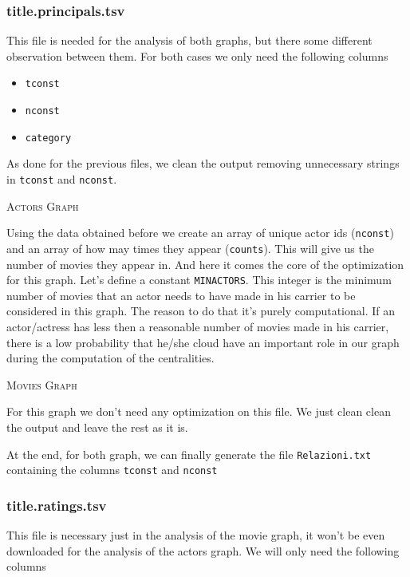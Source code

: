 \subsubsection{title.principals.tsv}

This file is needed for the analysis of both graphs, but there some different observation between them. For both cases we only need the following columns

\begin{itemize}
    \item \texttt{tconst}
    \item \texttt{nconst}
    \item \texttt{category}
\end{itemize}

\noindent As done for the previous files, we clean the output removing unnecessary strings in \texttt{tconst} and \texttt{nconst}. \s

\textsc{Actors Graph}
\s

\noindent Using the data obtained  before we create an array of unique actor ids (\texttt{nconst}) and an array of how may times they appear (\texttt{counts}). This will give us the number of movies they appear in. And here it comes the core of the optimization for this graph. Let's define a constant \texttt{MIN\textunderscore ACTORS}. This integer is the minimum number of movies that an actor needs to have made in his carrier to be considered in this graph. The reason to do that it's purely computational. If an actor/actress has less then a reasonable number of movies made in his carrier, there is a low probability that he/she cloud have an important role in our graph during the computation of the centralities. \s

\textsc{Movies Graph} \s

\noindent For this graph we don't need any optimization on this file. We just clean clean the output and leave the rest as it is. \s

\nd At the end, for both graph, we can finally generate the file \texttt{Relazioni.txt} containing the columns \texttt{tconst} and \texttt{nconst}

\subsubsection{title.ratings.tsv}

This file is necessary just in the analysis of the movie graph, it won't be even downloaded for the analysis of the actors graph. We will only need the following columns

